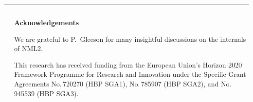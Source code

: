 \documentclass{beamer}
\begin{document}
\begin{frame}[t, fragile]
  \vspace*{1ex}
  \textcolor{arbgrey}{\rule{\textwidth}{0.5ex}}
  \vspace*{-1ex}
  \begin{columns}
    \begin{column}{0.49\textwidth}
      \printbibliography[type=article]
    \end{column}
    \begin{column}{0.49\textwidth}
      \printbibliography[nottype=article]

      \textbf{Acknowledgements}

      We are grateful to P.~Gleeson for many insightful discussions on the
      internals of NML2.

      This research has received funding from the European Union's Horizon 2020
      Framework Programme for Research and Innovation under the Specific Grant
      Agreements No.\,720270 (HBP SGA1), No.\,785907 (HBP SGA2), and No.\,945539
      (HBP SGA3).
    \end{column}
  \end{columns}
\end{frame}
\end{document}
